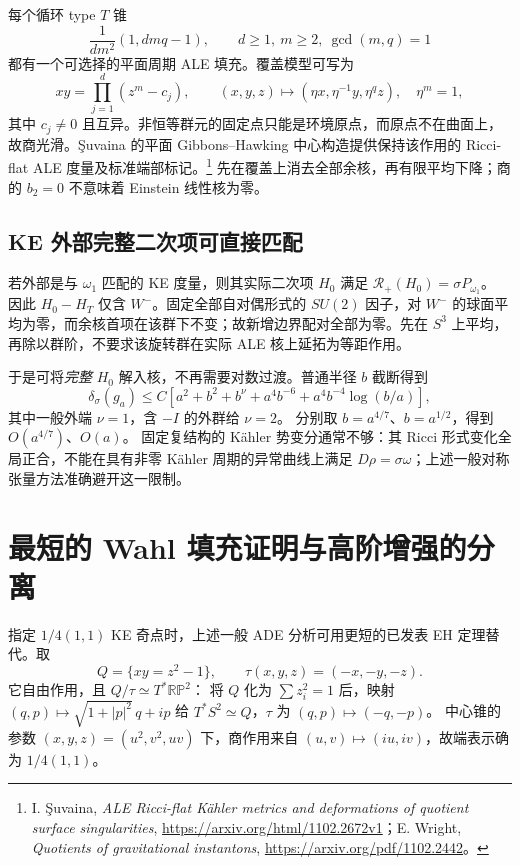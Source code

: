\documentclass[UTF8,fontset=fandol,zihao=-4,oneside,openany]{ctexbook}
\theoremstyle{cjkplain}
\numberwithin{equation}{chapter}
\begin{document}
每个循环 type \(T\) 锥
\[
\frac1{dm^2}(1,dmq-1),\qquad
d\ge1,\ m\ge2,\ \gcd(m,q)=1
\]
都有一个可选择的平面周期 ALE 填充。覆盖模型可写为
\[
xy=\prod_{j=1}^d(z^m-c_j),\qquad
(x,y,z)\longmapsto(\eta x,\eta^{-1}y,\eta^qz),
\quad \eta^m=1,
\]
其中 \(c_j\ne0\) 且互异。非恒等群元的固定点只能是环境原点，而原点不在曲面上，故商光滑。Şuvaina 的平面 Gibbons--Hawking 中心构造提供保持该作用的 Ricci-flat ALE 度量及标准端部标记。\footnote{I. Şuvaina, \emph{ALE Ricci-flat Kähler metrics and deformations of quotient surface singularities}, \url{https://arxiv.org/html/1102.2672v1}；E. Wright, \emph{Quotients of gravitational instantons}, \url{https://arxiv.org/pdf/1102.2442}。}
先在覆盖上消去全部余核，再有限平均下降；商的 \(b_2=0\) 不意味着 Einstein 线性核为零。

\subsection{KE 外部完整二次项可直接匹配}
若外部是与 \(\omega_1\) 匹配的 KE 度量，则其实际二次项 \(H_0\) 满足
\(\mathcal R_+(H_0)=\sigma P_{\omega_1}\)。
因此 \(H_0-H_T\) 仅含 \(W^-\)。固定全部自对偶形式的 \(SU(2)\) 因子，对 \(W^-\) 的球面平均为零，而余核首项在该群下不变；故新增边界配对全部为零。先在 \(S^3\) 上平均，再除以群阶，不要求该旋转群在实际 ALE 核上延拓为等距作用。

于是可将\emph{完整} \(H_0\) 解入核，不再需要对数过渡。普通半径 \(b\) 截断得到
\[
\delta_\sigma(g_a)\le C\left[
a^2+b^2+b^\nu+a^4b^{-6}
+a^4b^{-4}\log(b/a)\right],
\]
其中一般外端 \(\nu=1\)，含 \(-I\) 的外群给 \(\nu=2\)。
分别取 \(b=a^{4/7}\)、\(b=a^{1/2}\)，得到
\(O(a^{4/7})\)、\(O(a)\)。
固定复结构的 Kähler 势变分通常不够：其 Ricci 形式变化全局正合，不能在具有非零 Kähler 周期的异常曲线上满足
\(D\rho=\sigma\omega\)；上述一般对称张量方法准确避开这一限制。

\section{最短的 Wahl 填充证明与高阶增强的分离}
指定 \(1/4(1,1)\) KE 奇点时，上述一般 ADE 分析可用更短的已发表 EH 定理替代。取
\[
Q=\{xy=z^2-1\},\qquad \tau(x,y,z)=(-x,-y,-z).
\]
它自由作用，且 \(Q/\tau\simeq T^*\mathbb{RP}^2\)：
将 \(Q\) 化为 \(\sum z_i^2=1\) 后，映射
\((q,p)\mapsto\sqrt{1+|p|^2}\,q+ip\)
给 \(T^*S^2\simeq Q\)，\(\tau\) 为 \((q,p)\mapsto(-q,-p)\)。
中心锥的参数
\((x,y,z)=(u^2,v^2,uv)\) 下，商作用来自 \((u,v)\mapsto(iu,iv)\)，故端表示确为 \(1/4(1,1)\)。
\end{document}
